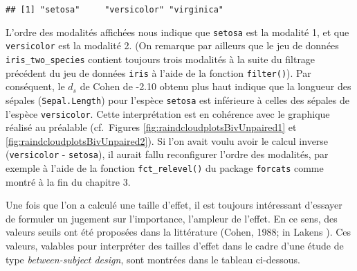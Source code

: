 \documentclass[
  french,
]{book}
\newenvironment{Shaded}{\begin{snugshade}}{\end{snugshade}}
\newcommand{\KeywordTok}[1]{\textcolor[rgb]{0.13,0.29,0.53}{\textbf{#1}}}
\newcommand{\NormalTok}[1]{#1}
\newcommand{\OperatorTok}[1]{\textcolor[rgb]{0.81,0.36,0.00}{\textbf{#1}}}
\begin{document}
\begin{Shaded}
\end{Shaded}

\begin{verbatim}
## [1] "setosa"     "versicolor" "virginica"
\end{verbatim}

L'ordre des modalités affichées nous indique que \texttt{setosa} est la modalité 1, et que \texttt{versicolor} est la modalité 2. (On remarque par ailleurs que le jeu de données \texttt{iris\_two\_species} contient toujours trois modalités à la suite du filtrage précédent du jeu de données \texttt{iris} à l'aide de la fonction \texttt{filter()}). Par conséquent, le \(d_{s}\) de Cohen de -2.10 obtenu plus haut indique que la longueur des sépales (\texttt{Sepal.Length}) pour l'espèce \texttt{setosa} est inférieure à celles des sépales de l'espèce \texttt{versicolor}. Cette interprétation est en cohérence avec le graphique réalisé au préalable (cf.~Figures \ref{fig:raindcloudplotsBivUnpaired1} et \ref{fig:raindcloudplotsBivUnpaired2}). Si l'on avait voulu avoir le calcul inverse (\texttt{versicolor} - \texttt{setosa}), il aurait fallu reconfigurer l'ordre des modalités, par exemple à l'aide de la fonction \texttt{fct\_relevel()} du package \texttt{forcats} comme montré à la fin du chapitre 3.

Une fois que l'on a calculé une taille d'effet, il est toujours intéressant d'essayer de formuler un jugement sur l'importance, l'ampleur de l'effet. En ce sens, des valeurs seuils ont été proposées dans la littérature (Cohen, 1988; in Lakens \autocite*{lakensCalculatingReportingEffect2013}). Ces valeurs, valables pour interpréter des tailles d'effet dans le cadre d'une étude de type \emph{between-subject design}, sont montrées dans le tableau ci-dessous.

\providecommand{\docline}[3]{\noalign{\global\setlength{\arrayrulewidth}{#1}}\arrayrulecolor[HTML]{#2}\cline{#3}}

\setlength{\tabcolsep}{2pt}

\renewcommand*{\arraystretch}{1.5}
\end{document}
